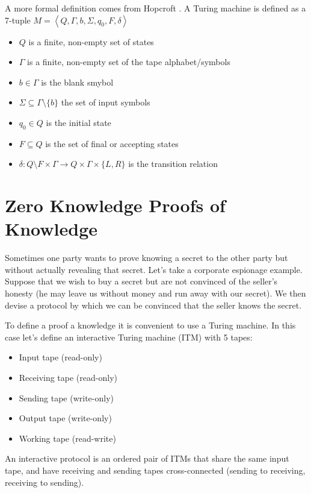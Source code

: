 A more formal definition comes from Hopcroft \cite{Hopcroft}. A Turing machine
is defined as a 7-tuple $M = \left< Q, \Gamma, b, \Sigma, q_0, F, \delta \right>$
\begin{itemize}
\item $Q$ is a finite, non-empty set of states
\item $\Gamma$ is a finite, non-empty set of the tape alphabet/symbols
\item $b \in \Gamma$ is the blank smybol
\item $\Sigma \subseteq \Gamma \setminus \{ b \}$ the set of input symbols
\item $q_0 \in Q$ is the initial state
\item $F \subseteq Q$ is the set of final or accepting states
\item $\delta : Q \setminus F \times \Gamma \rightarrow Q \times \Gamma \times \{ L,R \}$ is the transition relation
\end{itemize}

\section{Zero Knowledge Proofs of Knowledge}

Sometimes one party wants to prove knowing a secret to the other party
but without actually revealing that secret. Let's take a corporate
espionage example. Suppose that we wish to buy a secret but are not
convinced of the seller's honesty (he may leave us without money and
run away with our secret). We then devise a protocol by which we can
be convinced that the seller knows the secret.

\filbreak

To define a proof a knowledge it is convenient to use a Turing
machine. In this case let's define an interactive Turing machine (ITM)
with 5 tapes:
\begin{itemize}
\item Input tape (read-only)
\item Receiving tape (read-only)
\item Sending tape (write-only)
\item Output tape (write-only)
\item Working tape (read-write)
\end{itemize}

An interactive protocol is an ordered pair of ITMs that share the same
input tape, and have receiving and sending tapes cross-connected
(sending to receiving, receiving to sending).

